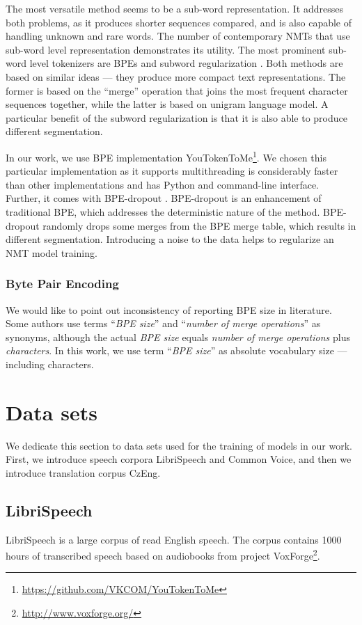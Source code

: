 The most versatile method seems to be a sub-word representation. It addresses both problems, as it produces shorter sequences compared, and is also capable of handling unknown and rare words. The number of contemporary NMTs that use sub-word level representation demonstrates its utility. The most prominent sub-word level tokenizers are BPEs  and subword regularization . Both methods are based on similar ideas --- they produce more compact text representations. The former is based on the ``merge'' operation that joins the most frequent character sequences together, while the latter is based on unigram language model. A particular benefit of the subword regularization is that it is also able to produce different segmentation.

In our work, we use BPE implementation YouTokenToMe\footnote{\url{https://github.com/VKCOM/YouTokenToMe}}. We chosen this particular implementation as it supports multithreading is considerably faster than other implementations and has Python and command-line interface. Further, it comes with BPE-dropout . BPE-dropout is an enhancement of traditional BPE, which addresses the deterministic nature of the method. BPE-dropout randomly drops some merges from the BPE merge table, which results in different segmentation. Introducing a noise to the data helps to regularize an NMT model training.

\subsubsection{Byte Pair Encoding}
We would like to point out inconsistency of reporting BPE size in literature. Some authors use terms ``\textit{BPE size}'' and ``\textit{number of merge operations}'' as synonyms, although the actual \textit{BPE size} equals \textit{number of merge operations} plus \textit{characters}. In this work, we use term ``\textit{BPE size}'' as absolute vocabulary size --- including characters. 

\section{Data sets}
We dedicate this section to data sets used for the training of models in our work. First, we introduce speech corpora LibriSpeech and Common Voice, and then we introduce translation corpus CzEng.

\subsection{LibriSpeech}
LibriSpeech  is a large corpus of read English speech. The corpus contains 1000 hours of transcribed speech based on audiobooks from project VoxForge\footnote{\url{http://www.voxforge.org/}}.

